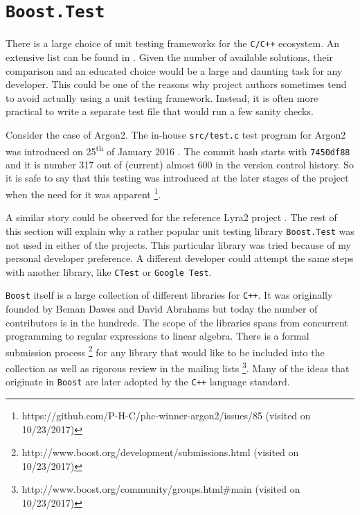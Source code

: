 \section{\texttt{Boost.Test}}
\label{sec:unit-boost-google}

There is a large choice of unit testing frameworks for the \texttt{C/C++} ecosystem. An extensive list can be found in \cite{wiki:2017:frameworks-c, wiki:2017:frameworks-cpp}. Given the number of available solutions, their comparison and an educated choice would be a large and daunting task for any developer. This could be one of the reasons why project authors sometimes tend to avoid actually using a unit testing framework. Instead, it is often more practical to write a separate test file that would run a few sanity checks.

Consider the case of Argon2. The in-house \texttt{src/test.c} test program for Argon2 was introduced on 25\textsuperscript{th} of January 2016 \cite{github:2017:argon2}. The commit hash starts with \texttt{7450df88} and it is number 317 out of (current) almost 600 in the version control history. So it is safe to say that this testing was introduced at the later stages of the project when the need for it was apparent \footnote{https://github.com/P-H-C/phc-winner-argon2/issues/85 (visited on 10/23/2017)}.

A similar story could be observed for the reference Lyra2 project \cite{github:2017:lyra}. The rest of this section will explain why a rather popular unit testing library \texttt{Boost.Test} was not used in either of the projects. This particular library was tried because of my personal developer preference. A different developer could attempt the same steps with another library, like \texttt{CTest} or \texttt{Google Test}.

\texttt{Boost} itself is a large collection of different libraries for \texttt{C++}. It was originally founded by Beman Dawes and David Abrahams but today the number of contributors is in the hundreds. The scope of the libraries spans from concurrent programming to regular expressions to linear algebra. There is a formal submission process \footnote{http://www.boost.org/development/submissions.html (visited on 10/23/2017)} for any library that would like to be included into the collection as well as rigorous review in the mailing lists \footnote{http://www.boost.org/community/groups.html\#main (visited on 10/23/2017)}. Many of the ideas that originate in \texttt{Boost} are later adopted by the \texttt{C++} language standard.

